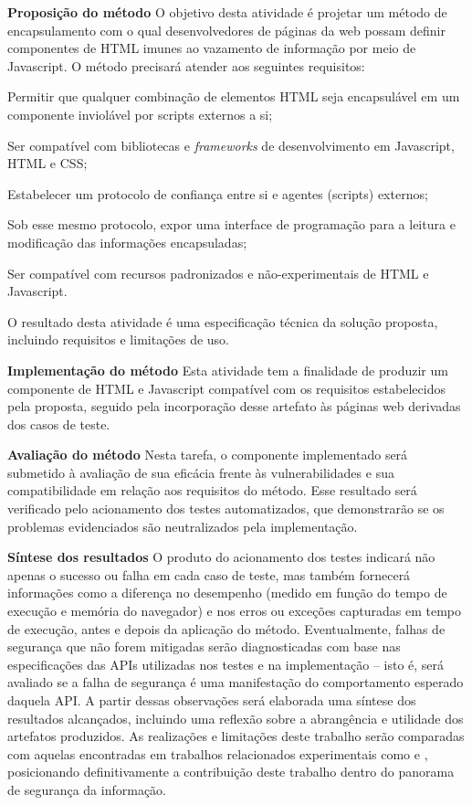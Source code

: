 \begin{alineas}
	\item \textbf{Proposição do método}
	O objetivo desta atividade é projetar um método de encapsulamento com o qual desenvolvedores de páginas da web possam definir componentes de HTML imunes ao vazamento de informação por meio de Javascript. O método precisará atender aos seguintes requisitos:
	
	\begin{alineas}
		\item Permitir que qualquer combinação de elementos HTML seja encapsulável em um componente inviolável por scripts externos a si;
		\item Ser compatível com bibliotecas e \textit{frameworks} de desenvolvimento em Javascript, HTML e CSS;
		\item Estabelecer um protocolo de confiança entre si e agentes (scripts) externos;
		\item Sob esse mesmo protocolo, expor uma interface de programação para a leitura e modificação das informações encapsuladas;
		\item Ser compatível com recursos padronizados e não-experimentais de HTML e Javascript.
	\end{alineas}
	
	O resultado desta atividade é uma especificação técnica da solução proposta, incluindo requisitos e limitações de uso.
	
	\item \textbf{Implementação do método}
	Esta atividade tem a finalidade de produzir um componente de HTML e Javascript compatível com os requisitos estabelecidos pela proposta, seguido pela incorporação desse artefato às páginas web derivadas dos casos de teste.
	
	\item\textbf{Avaliação do método}
	Nesta tarefa, o componente implementado será submetido à avaliação de sua eficácia frente às vulnerabilidades e sua compatibilidade em relação aos requisitos do método. Esse resultado será verificado pelo acionamento dos testes automatizados, que demonstrarão se os problemas evidenciados são neutralizados pela implementação.
	
	\item \textbf{Síntese dos resultados}
	O produto do acionamento dos testes indicará não apenas o sucesso ou falha em cada caso de teste, mas também fornecerá informações como a diferença no desempenho (medido em função do tempo de execução e memória do navegador) e nos erros ou exceções capturadas em tempo de execução, antes e depois da aplicação do método. Eventualmente, falhas de segurança que não forem mitigadas serão diagnosticadas com base nas especificações das APIs utilizadas nos testes e na implementação -- isto é, será avaliado se a falha de segurança é uma manifestação do comportamento esperado daquela API. A partir dessas observações será elaborada uma síntese dos resultados alcançados, incluindo uma reflexão sobre a abrangência e utilidade dos artefatos produzidos. As realizações e limitações deste trabalho serão comparadas com aquelas encontradas em trabalhos relacionados experimentais como \cite{Hedin2014} e \cite{Stefan2014}, posicionando definitivamente a contribuição deste trabalho dentro do panorama de segurança da informação.
\end{alineas}
